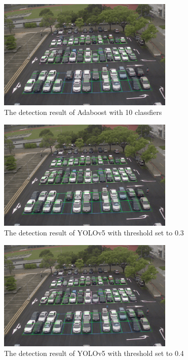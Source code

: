 \documentclass{article}[12pt]
\begin{document}
\begin{figure}[H]
    \centering
    \includegraphics[width=0.75\textwidth]{figure/Adaboost_first_frame_10.png}
    \caption{The detection result of Adaboost with 10 classfiers}
\end{figure}

\begin{figure}[H]
    \centering
    \includegraphics[width=0.75\textwidth]{figure/Yolov5_first_frame_3.png}
    \caption{The detection result of YOLOv5 with threshold set to 0.3}
\end{figure}


\begin{figure}[H]
    \centering
    \includegraphics[width=0.75\textwidth]{figure/Yolov5_first_frame_4.png}
    \caption{The detection result of YOLOv5 with threshold set to 0.4}
\end{figure}
\end{document}

